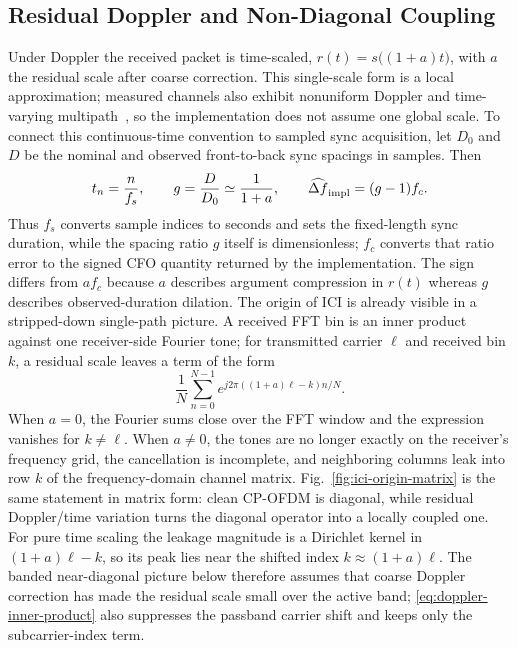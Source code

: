 \documentclass[journal]{IEEEtran}
\begin{document}
\subsection{Residual Doppler and Non-Diagonal Coupling}
Under Doppler the received packet is time-scaled, $r(t)=s\big((1+a)t\big)$, with
$a$ the residual scale after coarse correction. This single-scale form is a
local approximation; measured channels also exhibit nonuniform Doppler and
time-varying multipath~\cite{li2008nonuniform}, so the implementation does not
assume one global scale. To connect this continuous-time convention to sampled
sync acquisition, let $D_0$ and $D$ be the nominal and observed front-to-back
sync spacings in samples. Then
\begin{equation}
  t_n=\frac{n}{f_s},\qquad
  g=\frac{D}{D_0}\simeq\frac{1}{1+a},\qquad
  \widehat{\Delta f}_{\rm impl}=(g-1)f_c .
  \label{eq:coarse-scale-cfo}
\end{equation}
Thus $f_s$ converts sample indices to seconds and sets the fixed-length sync
duration, while the spacing ratio $g$ itself is dimensionless; $f_c$ converts
that ratio error to the signed CFO quantity returned by the implementation.
The sign differs from $a f_c$ because $a$ describes argument compression in
$r(t)$ whereas $g$ describes observed-duration dilation. The origin of ICI is
already visible in a stripped-down
single-path picture. A received FFT bin is an inner product against one
receiver-side Fourier tone; for transmitted carrier $\ell$ and received bin $k$,
a residual scale leaves a term of the form
\begin{equation}
  \frac{1}{N}\sum_{n=0}^{N-1}
  e^{j2\pi((1+a)\ell-k)n/N}.
  \label{eq:doppler-inner-product}
\end{equation}
When $a=0$, the Fourier sums close over the FFT window and the expression
vanishes for $k\ne\ell$. When $a\ne0$, the tones are no longer exactly on the
receiver's frequency grid, the cancellation is incomplete, and neighboring
columns leak into row $k$ of the frequency-domain channel matrix. Fig.~\ref{fig:ici-origin-matrix}
is the same statement in matrix form: clean CP-OFDM is diagonal, while residual
Doppler/time variation turns the diagonal operator into a locally coupled one.
For pure time scaling the leakage magnitude is a Dirichlet kernel in
$(1+a)\ell-k$, so its peak lies near the shifted index
$k\approx(1+a)\ell$. The banded near-diagonal picture below therefore assumes
that coarse Doppler correction has made the residual scale small over the active
band; \eqref{eq:doppler-inner-product} also suppresses the passband carrier
shift and keeps only the subcarrier-index term.
\end{document}
